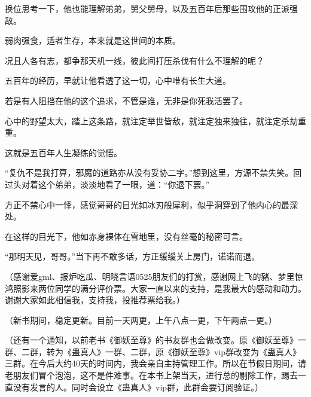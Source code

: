 \begin{this_body}
换位思考一下，他也能理解弟弟，舅父舅母，以及五百年后那些围攻他的正派强敌。

弱肉强食，适者生存，本来就是这世间的本质。

况且人各有志，都争那天机一线，彼此间打压杀伐有什么不理解的呢？

五百年的经历，早就让他看透了这一切，心中唯有长生大道。

若是有人阻挡在他的这个追求，不管是谁，无非是你死我活罢了。

心中的野望太大，踏上这条路，就注定举世皆敌，就注定独来独往，就注定杀劫重重。

这就是五百年人生凝练的觉悟。

“复仇不是我打算，邪魔的道路亦从没有妥协二字。”想到这里，方源不禁失笑。回过头对着这个弟弟，淡淡地看了一眼，道：“你退下罢。”

方正不禁心中一悸，感觉哥哥的目光如冰刃般犀利，似乎洞穿到了他内心的最深处。

在这样的目光下，他如赤身裸体在雪地里，没有丝毫的秘密可言。

“那明天见，哥哥。”当下再不敢多话，方正缓缓关上房门，诺诺而退。

（感谢爱gml、报炉吃瓜、明晓言语0525朋友们的打赏，感谢网上飞的豬、梦里惊鸿照影来两位同学的满分评价票。大家一直以来的支持，是我最大的感动和动力。谢谢大家如此相信我，支持我，投推荐票给我。）

（新书期间，稳定更新。目前一天两更，上午八点一更，下午两点一更。）

（还有一个通知，以前老书《御妖至尊》的书友群也会做改变。原《御妖至尊》一群、二群，转为《蛊真人》一群、二群，原《御妖至尊》vip群改变为《蛊真人》三群。在今后大约40天的时间内，我会亲自主持管理工作。所以在节假日期间，请老朋友们冒个泡泡，这不是件难事。在本书上架当天，进行总的剔除工作，踢去一直没有发言的人。同时会设立《蛊真人》vip群，此群会要订阅验证。）

\end{this_body}

